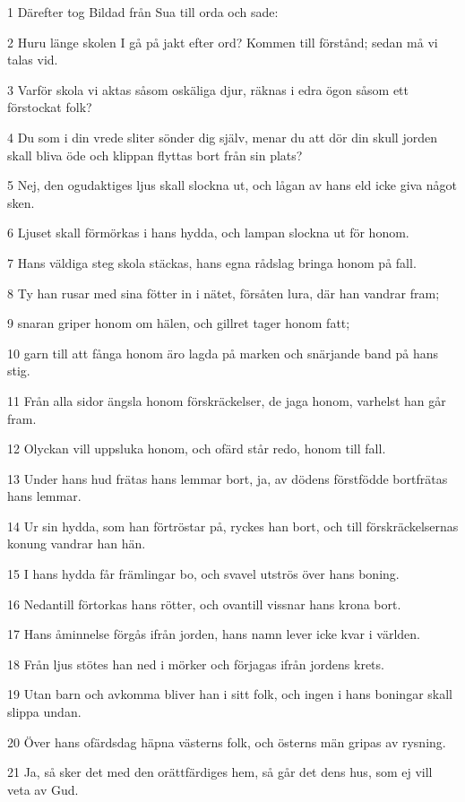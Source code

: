 \par 1 Därefter tog Bildad från Sua till orda och sade:
\par 2 Huru länge skolen I gå på jakt efter ord? Kommen till förstånd; sedan må vi talas vid.
\par 3 Varför skola vi aktas såsom oskäliga djur, räknas i edra ögon såsom ett förstockat folk?
\par 4 Du som i din vrede sliter sönder dig själv, menar du att dör din skull jorden skall bliva öde och klippan flyttas bort från sin plats?
\par 5 Nej, den ogudaktiges ljus skall slockna ut, och lågan av hans eld icke giva något sken.
\par 6 Ljuset skall förmörkas i hans hydda, och lampan slockna ut för honom.
\par 7 Hans väldiga steg skola stäckas, hans egna rådslag bringa honom på fall.
\par 8 Ty han rusar med sina fötter in i nätet, försåten lura, där han vandrar fram;
\par 9 snaran griper honom om hälen, och gillret tager honom fatt;
\par 10 garn till att fånga honom äro lagda på marken och snärjande band på hans stig.
\par 11 Från alla sidor ängsla honom förskräckelser, de jaga honom, varhelst han går fram.
\par 12 Olyckan vill uppsluka honom, och ofärd står redo, honom till fall.
\par 13 Under hans hud frätas hans lemmar bort, ja, av dödens förstfödde bortfrätas hans lemmar.
\par 14 Ur sin hydda, som han förtröstar på, ryckes han bort, och till förskräckelsernas konung vandrar han hän.
\par 15 I hans hydda får främlingar bo, och svavel utströs över hans boning.
\par 16 Nedantill förtorkas hans rötter, och ovantill vissnar hans krona bort.
\par 17 Hans åminnelse förgås ifrån jorden, hans namn lever icke kvar i världen.
\par 18 Från ljus stötes han ned i mörker och förjagas ifrån jordens krets.
\par 19 Utan barn och avkomma bliver han i sitt folk, och ingen i hans boningar skall slippa undan.
\par 20 Över hans ofärdsdag häpna västerns folk, och österns män gripas av rysning.
\par 21 Ja, så sker det med den orättfärdiges hem, så går det dens hus, som ej vill veta av Gud.

